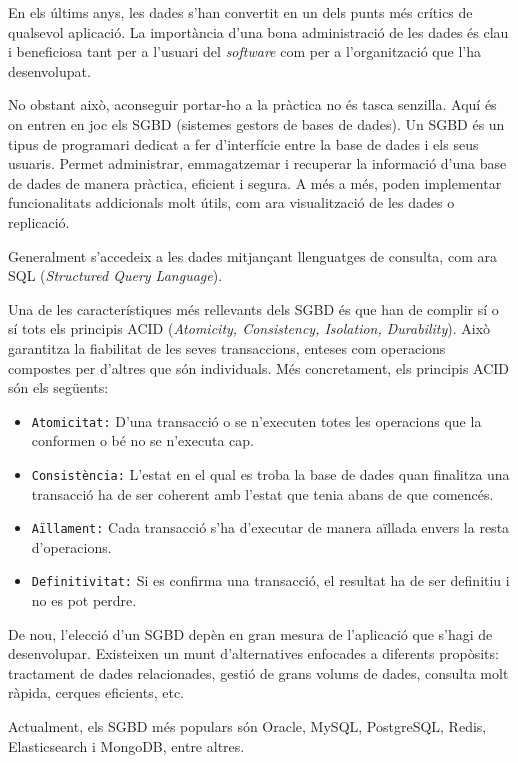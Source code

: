 \documentclass[a4paper,12pt]{ThesisStyle}
\begin{document}
En els últims anys, les dades s'han convertit en un dels punts més crítics de qualsevol aplicació. La importància d'una bona administració de les dades és clau i beneficiosa tant per a l'usuari del \textit{software} com per a l'organització que l'ha desenvolupat.

No obstant això, aconseguir portar-ho a la pràctica no és tasca senzilla. Aquí és on entren en joc els SGBD (sistemes gestors de bases de dades). Un SGBD és un tipus de programari dedicat a fer d'interfície entre la base de dades i els seus usuaris. Permet administrar, emmagatzemar i recuperar la informació d'una base de dades de manera pràctica, eficient i segura. A més a més, poden implementar funcionalitats addicionals molt útils, com ara visualització de les dades o replicació.

Generalment s'accedeix a les dades mitjançant llenguatges de consulta, com ara SQL (\textit{Structured Query Language}).

Una de les característiques més rellevants dels SGBD és que han de complir sí o sí tots els principis ACID (\textit{Atomicity, Consistency, Isolation, Durability}). Això garantitza la fiabilitat de les seves transaccions, enteses com operacions compostes per d'altres que són individuals. Més concretament, els principis ACID són els següents:
\begin{itemize}
  \item \texttt{Atomicitat:} D'una transacció o se n'executen totes les operacions que la conformen o bé no se n'executa cap.
  \item \texttt{Consistència:} L'estat en el qual es troba la base de dades quan finalitza una transacció ha de ser coherent amb l'estat que tenia abans de que comencés.
  \item \texttt{Aïllament:} Cada transacció s'ha d'executar de manera aïllada envers la resta d'operacions.
  \item \texttt{Definitivitat:} Si es confirma una transacció, el resultat ha de ser definitiu i no es pot perdre.
\end{itemize}

De nou, l'elecció d'un SGBD depèn en gran mesura de l'aplicació que s'hagi de desenvolupar. Existeixen un munt d'alternatives enfocades a diferents propòsits: tractament de dades relacionades, gestió de grans volums de dades, consulta molt ràpida, cerques eficients, etc.

Actualment, els SGBD més populars són Oracle, MySQL, PostgreSQL, Redis, Elasticsearch i MongoDB, entre altres.
\end{document}
